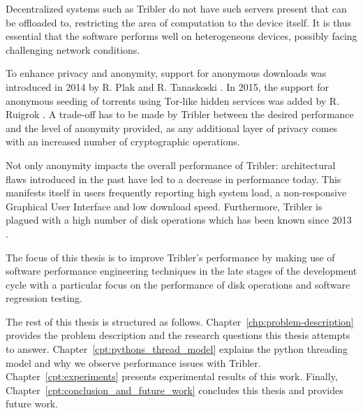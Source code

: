 Decentralized systems such as Tribler do not have such servers present that can be offloaded to, restricting the area of computation to the device itself.
It is thus essential that the software performs well on heterogeneous devices, possibly facing challenging network conditions.

To enhance privacy and anonymity, support for anonymous downloads was introduced in 2014 by R. Plak \cite{plak2014anonymous} and R. Tanaskoski \cite{tanaskoski2014anonymous}.
In 2015, the support for anonymous seeding of torrents using Tor-like hidden services was added by R. Ruigrok \cite{ruigrok2015bittorrent}.
A trade-off has to be made by Tribler between the desired performance and the level of anonymity provided, as any additional layer of privacy comes with an increased number of cryptographic operations.

Not only anonymity impacts the overall performance of Tribler: architectural flaws introduced in the past have led to a decrease in performance today.
This manifests itself in users frequently reporting high system load, a non-responsive Graphical User Interface and low download speed.
Furthermore, Tribler is plagued with a high number of disk operations which has been known since 2013 \cite{pouwelse2014reduce}. 

The focus of this thesis is to improve Tribler's performance by making use of software performance engineering techniques in the late stages of the development cycle with a particular focus on the performance of disk operations and software regression testing.

The rest of this thesis is structured as follows.
Chapter~\ref{chp:problem-description} provides the problem description and the research questions this thesis attempts to answer.
Chapter~\ref{cpt:pythons_thread_model} explains the python threading model and why we observe performance issues with Tribler.
Chapter~\ref{cpt:experiments} presents experimental results of this work.
Finally, Chapter~\ref{cpt:conclusion_and_future_work} concludes this thesis and provides future work.
